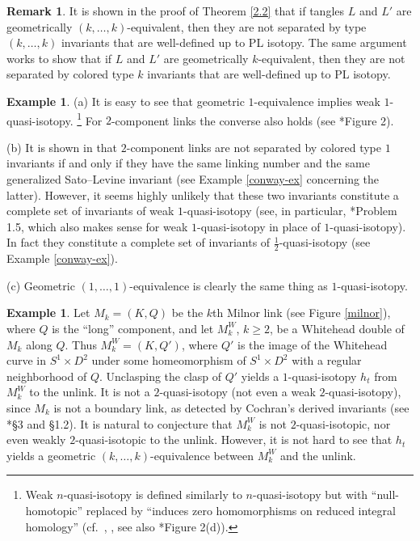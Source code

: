 \documentclass[a4paper,12pt,reqno,oneside]{amsart} %
\theoremstyle{plain}
\theoremstyle{definition}
\newtheorem{remark}[theorem]{Remark}
\newtheorem{example}[theorem]{Example}
\theoremstyle{named}
\def\x{\times}
\renewcommand{\:}{\colon}
\begin{document}
\begin{remark}
It is shown in the proof of Theorem \ref{2.2} that if tangles $L$ and $L'$ are geometrically $(k,\dots,k)$-equivalent, then they are not
separated by type $(k,\dots,k)$ invariants that are well-defined up to PL isotopy.
The same argument works to show that if $L$ and $L'$ are geometrically $k$-equivalent, then they are not separated by colored type 
$k$ invariants that are well-defined up to PL isotopy.
\end{remark}

\begin{example} \label{weak}
(a) It is easy to see that geometric $1$-equivalence implies weak $1$-quasi-isotopy.%
\footnote{Weak $n$-quasi-isotopy is defined similarly to $n$-quasi-isotopy but with ``null-homotopic'' replaced by
``induces zero homomorphisms on reduced integral homology'' (cf.\ \cite{MR1}, \cite{MR2}, see also \cite{MR1}*{Figure 2(d)}).}
For $2$-component links the converse also holds (see \cite{Mi1}*{Figure 2}).

(b) It is shown in \cite{KL} that $2$-component links are not separated by colored type $1$ invariants if and only if they have 
the same linking number and the same generalized Sato--Levine invariant (see Example \ref{conway-ex} concerning the latter).
However, it seems highly unlikely that these two invariants constitute a complete set of invariants of weak $1$-quasi-isotopy
(see, in particular, \cite{MR1}*{Problem 1.5}, which also makes sense for weak $1$-quasi-isotopy in place of $1$-quasi-isotopy).
In fact they constitute a complete set of invariants of $\frac12$-quasi-isotopy (see Example \ref{conway-ex}). 

(c) Geometric $(1,\dots,1)$-equivalence is clearly the same thing as $1$-quasi-isotopy.
\end{example}

\begin{example} \label{milnor-double}
Let $M_k=(K,Q)$ be the $k$th Milnor link (see Figure \ref{milnor}), where $Q$ is the ``long'' component,
and let $M^W_k$, $k\ge 2$, be a Whitehead double of $M_k$ along $Q$.
Thus $M^W_k=(K,Q')$, where $Q'$ is the image of the Whitehead curve in $S^1\x D^2$ under some homeomorphism of $S^1\x D^2$ 
with a regular neighborhood of $Q$.
Unclasping the clasp of $Q'$ yields a $1$-quasi-isotopy $h_t$ from $M^W_k$ to the unlink.
It is not a $2$-quasi-isotopy (not even a weak $2$-quasi-isotopy), since $M_k$ is not a boundary link, as detected by Cochran's 
derived invariants (see \cite{MR2}*{\S3 and \S1.2}).
It is natural to conjecture that $M^W_k$ is not $2$-quasi-isotopic, nor even weakly $2$-quasi-isotopic to the unlink.
However, it is not hard to see that $h_t$ yields a geometric $(k,\dots,k)$-equivalence between $M^W_k$ and the unlink.
\end{example}
\end{document}
